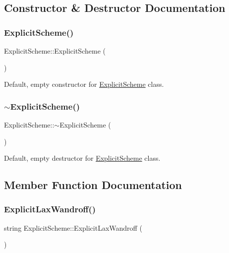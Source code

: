 \subsection{Constructor \& Destructor Documentation}
\mbox{\label{class_explicit_scheme_ae63cfb8d333897b625dd17dc2acb4c46}} 
\subsubsection{\texorpdfstring{Explicit\+Scheme()}{ExplicitScheme()}}
{\footnotesize\ttfamily Explicit\+Scheme\+::\+Explicit\+Scheme (\begin{DoxyParamCaption}{ }\end{DoxyParamCaption})}

Default, empty constructor for \mbox{\hyperlink{class_explicit_scheme}{Explicit\+Scheme}} class. \mbox{\label{class_explicit_scheme_a5eee023f6f9d09609066a50dd620b49a}} 
\subsubsection{\texorpdfstring{$\sim$\+Explicit\+Scheme()}{~ExplicitScheme()}}
{\footnotesize\ttfamily Explicit\+Scheme\+::$\sim$\+Explicit\+Scheme (\begin{DoxyParamCaption}{ }\end{DoxyParamCaption})}

Default, empty destructor for \mbox{\hyperlink{class_explicit_scheme}{Explicit\+Scheme}} class. 

\subsection{Member Function Documentation}
\mbox{\label{class_explicit_scheme_a2698e08e62763c56b972b478d665c34c}} 
\subsubsection{\texorpdfstring{Explicit\+Lax\+Wandroff()}{ExplicitLaxWandroff()}}
{\footnotesize\ttfamily string Explicit\+Scheme\+::\+Explicit\+Lax\+Wandroff (\begin{DoxyParamCaption}{ }\end{DoxyParamCaption})}

